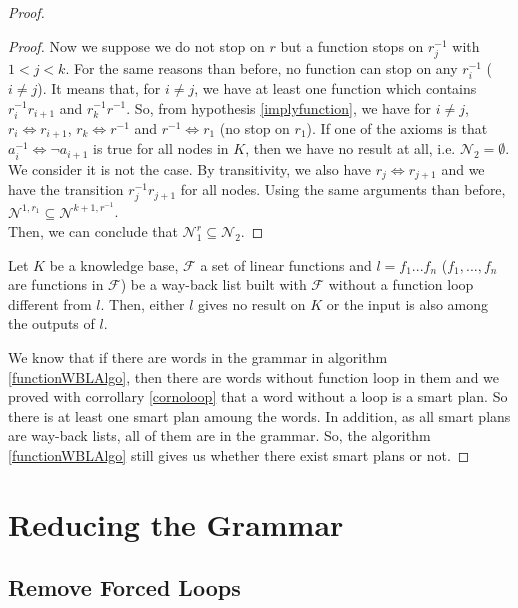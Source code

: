 \documentclass[10pt,a4paper,draft]{article}
\begin{document}
\begin{proof}
\begin{proof}
Now we suppose we do not stop on $r$ but a function stops on $r_j^{-1}$ with $ 1 < j < k$. For the same reasons than before, no function can stop on any $r_i^{-1}$ ($ i \neq j$). It means that, for $i \neq j$, we have at least one function which contains $r_i^{-1} r_{i+1}$ and $r_k^{-1} r^{-1}$. So, from hypothesis \ref{implyfunction}, we have for $i \neq j$, $r_i \Leftrightarrow r_{i+1}$, $r_k \Leftrightarrow r^{-1}$ and $r^{-1} \Leftrightarrow r_1$ (no stop on $r_1$). If one of the axioms is that $a_{i}^{-1} \Leftrightarrow \neg a_{i+1}$ is true for all nodes in $K$, then we have no result at all, i.e. $\mathcal{N}_2 = \emptyset$. We consider it is not the case. By transitivity, we also have $r_j \Leftrightarrow r_{j+1}$ and we have the transition $r_j^{-1} r_{j+1}$ for all nodes. Using the same arguments than before, $\mathcal{N}^{1, r_1} \subseteq \mathcal{N}^{k+1, r^{-1}}$.\\

Then, we can conclude that $\mathcal{N}_1^r \subseteq \mathcal{N}_2$.
\end{proof}


\begin{Corrollary}
\label{cornoloop}
Let $K$ be a knowledge base, $\mathcal{F}$ a set of linear functions and $l = f_1 ... f_n$ ($f_1,...,f_n$ are functions in $\mathcal{F}$) be a way-back list built with $\mathcal{F}$ without a function loop different from $l$. Then, either $l$ gives no result on $K$ or the input is also among the outputs of $l$.
\end{Corrollary}

We know that if there are words in the grammar in algorithm \ref{functionWBLAlgo}, then there are words without function loop in them and we proved with corrollary \ref{cornoloop} that a word without a loop is a smart plan. So there is at least one smart plan amoung the words. In addition, as all smart plans are way-back lists, all of them are in the grammar. So, the algorithm \ref{functionWBLAlgo} still gives us whether there exist smart plans or not.

\end{proof}


\section{Reducing the Grammar}

\subsection{Remove Forced Loops}
\end{document}
